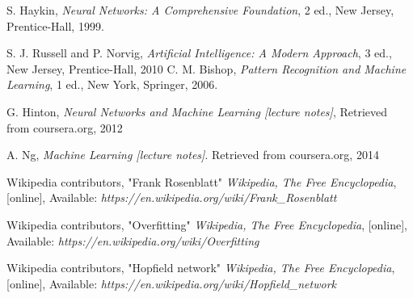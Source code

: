 \documentclass[11pt,a4paper,twocolumn]{article}
\begin{document}
\begin{latin}
{
\small
\singlespacing
\setlength{\itemsep}{-2ex}
\renewcommand{\refname}{\rl{{مراجع}\hfill}}
%
\begin{thebibliography}{1}

      S. Haykin, {\em Neural Networks: A Comprehensive Foundation}, 2 ed., New Jersey, Prentice-Hall, 1999.
    
      S. J. Russell and P. Norvig, {\em Artificial Intelligence: A Modern Approach}, 3 ed., New Jersey, Prentice-Hall, 2010
     C. M. Bishop, {\em Pattern Recognition and Machine Learning}, 1 ed., New York, Springer, 2006.

      G. Hinton, {\em Neural Networks and Machine Learning [lecture notes]}, Retrieved from coursera.org, 2012

      A. Ng, {\em Machine Learning [lecture notes]}. Retrieved from coursera.org, 2014
    
     Wikipedia contributors, "Frank Rosenblatt" {\em Wikipedia, The Free Encyclopedia}, [online], Available: {\em https://en.wikipedia.org/wiki/Frank\_Rosenblatt}
    
     Wikipedia contributors, "Overfitting" {\em Wikipedia, The Free Encyclopedia}, [online], Available: {\em https://en.wikipedia.org/wiki/Overfitting}
    
     Wikipedia contributors, "Hopfield network" {\em Wikipedia, The Free Encyclopedia}, [online], Available: {\em https://en.wikipedia.org/wiki/Hopfield\_network }

  \end{thebibliography}
}
\end{latin}
\end{document}
